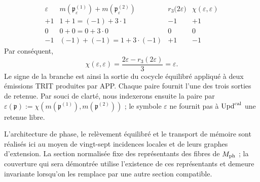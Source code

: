 \begin{equation}
 \begin{array}{c|c|c|c}
 \varepsilon&m(\mathfrak p_\varepsilon^{(1)})
                  +m(\mathfrak p_\varepsilon^{(2)})
   &r_3\bigl(2\varepsilon\bigr)&
   \chi(\varepsilon,\varepsilon)\\ \hline
 +1&1+1=(-1)+3\cdot1&-1&+1\\
 0&0+0=0+3\cdot0&0&0\\
 -1&(-1)+(-1)=1+3\cdot(-1)&+1&-1
 \end{array}
 \label{ix:eq:tres-carry-derivados-ch}
\end{equation}
Par conséquent,
\begin{equation}
 \chi(\varepsilon,\varepsilon)
 =\frac{2\varepsilon-r_3(2\varepsilon)}3=\varepsilon.
 \label{ix:eq:carry-no-parametrico-ch}
\end{equation}
Le signe de la branche est ainsi la sortie du cocycle équilibré appliqué à deux
émissions TRIT produites par APP. Chaque paire fournit l’une des trois
sorties de retenue. Par souci de clarté, nous indexerons ensuite la paire par
\(\varepsilon(\mathfrak p):=
\chi(m(\mathfrak p^{(1)}),m(\mathfrak p^{(2)}))\) ; le symbole
\(\varepsilon\) ne fournit pas à \(\operatorname{Upd}^{\rm cal}\) une retenue libre.

L’architecture de phase, le relèvement équilibré et le transport de
mémoire sont réalisés ici au moyen de vingt-sept incidences locales et de leurs
graphes d’extension. La section normalisée fixe des représentants des
fibres de \(M_{\rm ph}\) ; la couverture qui sera démontrée utilise l’existence
de ces représentants et demeure invariante lorsqu’on les remplace par une autre
section compatible.

